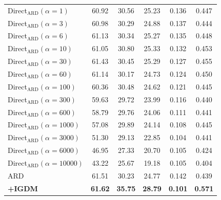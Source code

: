 \documentclass{article} %
\begin{document}
\begin{table}[h]
\begin{tabular}{lccccc}
Direct$_{\text{ARD}} (\alpha = 1)$ & 60.92 & 30.56 & 25.23 & 0.136 & 0.447 \\
Direct$_{\text{ARD}} (\alpha = 3)$ & 60.98 & 30.29 & 24.88 & 0.137 & 0.444 \\
Direct$_{\text{ARD}} (\alpha = 6)$ & 61.13 & 30.34 & 25.27 & 0.135 & 0.448 \\
Direct$_{\text{ARD}} (\alpha = 10)$ & 61.05 & 30.80 & 25.33 & 0.132 & 0.453 \\
Direct$_{\text{ARD}} (\alpha = 30)$ & 61.43 & 30.45 & 25.29 & 0.127 & 0.455 \\
Direct$_{\text{ARD}} (\alpha = 60)$ & 61.14 & 30.17 & 24.73 & 0.124 & 0.450 \\
Direct$_{\text{ARD}} (\alpha = 100)$ & 60.36 & 30.48 & 24.62 & 0.121 & 0.445 \\
Direct$_{\text{ARD}} (\alpha = 300)$ & 59.63 & 29.72 & 23.99 & 0.116 & 0.440 \\
Direct$_{\text{ARD}} (\alpha = 600)$ & 58.79 & 29.76 & 24.06 & 0.111 & 0.441 \\
Direct$_{\text{ARD}} (\alpha = 1000)$ & 57.08 & 29.89 & 24.14 & 0.108 & 0.445 \\
Direct$_{\text{ARD}} (\alpha = 3000)$ & 51.30 & 29.13 & 22.85 & 0.104 & 0.441 \\
Direct$_{\text{ARD}} (\alpha = 6000)$ & 46.95 & 27.33 & 20.70 & 0.105 & 0.424 \\
Direct$_{\text{ARD}} (\alpha = 10000)$ & 43.22 & 25.67 & 19.18 & 0.105 & 0.404 \\
\midrule
 ARD \citep{ard} & 61.51 & 30.23 & 24.77 & 0.142& 0.439\\
 \textbf{+IGDM} & \textbf{61.62} & \textbf{35.75} & \textbf{28.79} & \textbf{0.101}& \textbf{0.571}\\


\end{tabular}
\end{table}
\end{document}
